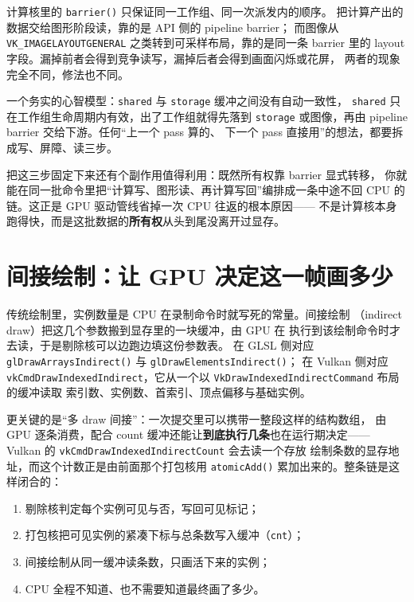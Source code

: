 \documentclass[12pt,a4paper,fontset=fandol]{ctexbook}
\newcommand{\Fn}[1]{\texttt{#1()}}
\newcommand{\Tp}[1]{\texttt{#1}}
\newcommand{\Bk}{\discretionary{}{}{}}
\newcommand{\Lang}[1]{\textsf{#1}}
\newcommand{\DomCPU}{\Lang{CPU}}
\newcommand{\DomGPU}{\Lang{GPU}}
\newcommand{\GSL}{\Lang{GLSL}}
\begin{document}
\begin{warning}[title={barrier 与 pipeline barrier 常被混为一谈}]
计算核里的 \Fn{barrier} 只保证同一工作组、同一次派发内的顺序。
把计算产出的数据交给图形阶段读，靠的是 API 侧的 pipeline barrier；
而图像从 \Tp{VK\_IMAGE\Bk LAYOUT\Bk GENERAL} 之类转到可采样布局，靠的是同一条 barrier 里的
layout 字段。漏掉前者会得到竞争读写，漏掉后者会得到画面闪烁或花屏，
两者的现象完全不同，修法也不同。
\end{warning}

一个务实的心智模型：\Tp{shared} 与 \Tp{storage} 缓冲之间没有自动一致性，
\Tp{shared} 只在工作组生命周期内有效，出了工作组就得先落到
\Tp{storage} 或图像，再由 pipeline barrier 交给下游。任何``上一个 pass 算的、
下一个 pass 直接用''的想法，都要拆成写、屏障、读三步。

把这三步固定下来还有个副作用值得利用：既然所有权靠 barrier 显式转移，
你就能在同一批命令里把``计算写、图形读、再计算写回''编排成一条中途不回
\DomCPU{} 的链。这正是 GPU 驱动管线省掉一次 \DomCPU{} 往返的根本原因——
不是计算核本身跑得快，而是这批数据的\textbf{所有权}从头到尾没离开过显存。

\section{间接绘制：让 GPU 决定这一帧画多少}

传统绘制里，实例数量是 \DomCPU{} 在录制命令时就写死的常量。间接绘制
（indirect draw）把这几个参数搬到显存里的一块缓冲，由 \DomGPU{} 在
执行到该绘制命令时才去读，于是剔除核可以边跑边填这份参数表。
在 \GSL{} 侧对应 \Fn{glDrawArraysIndirect} 与 \Fn{glDrawElementsIndirect}；
在 Vulkan 侧对应 \Tp{vkCmdDraw\Bk Indexed\Bk Indirect}，它从一个以
\Tp{VkDraw\Bk Indexed\Bk Indirect\Bk Command} 布局的缓冲读取
索引数、实例数、首索引、顶点偏移与基础实例。

更关键的是``多 draw 间接''：一次提交里可以携带一整段这样的结构数组，
由 \DomGPU{} 逐条消费，配合 count 缓冲还能让\textbf{到底执行几条}也在运行期决定——
Vulkan 的 \Tp{vkCmdDraw\Bk Indexed\Bk Indirect\Bk Count} 会去读一个存放
绘制条数的显存地址，而这个计数正是由前面那个打包核用 \Fn{atomicAdd}
累加出来的。整条链是这样闭合的：

\begin{enumerate}
  \item 剔除核判定每个实例可见与否，写回可见标记；
  \item 打包核把可见实例的紧凑下标与总条数写入缓冲（\Tp{cnt}）；
  \item 间接绘制从同一缓冲读条数，只画活下来的实例；
  \item \DomCPU{} 全程不知道、也不需要知道最终画了多少。
\end{enumerate}
\end{document}
